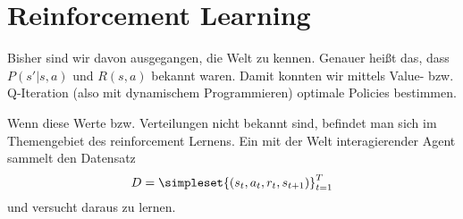 \section{Reinforcement Learning}
Bisher sind wir davon ausgegangen, die Welt zu kennen. Genauer heißt das, dass $P(s'|s,a)$ und $R(s,a)$ bekannt waren. Damit konnten wir mittels Value- bzw. Q-Iteration (also mit dynamischem Programmieren) optimale Policies bestimmen.

Wenn diese Werte bzw. Verteilungen nicht bekannt sind, befindet man sich im Themengebiet des reinforcement Lernens.
Ein mit der Welt interagierender Agent sammelt den Datensatz
\begin{equation*}
	D=\simpleset{(s_t,a_t,r_t,s_{t+1})}_{t=1}^T
\end{equation*}
und versucht daraus zu lernen.

